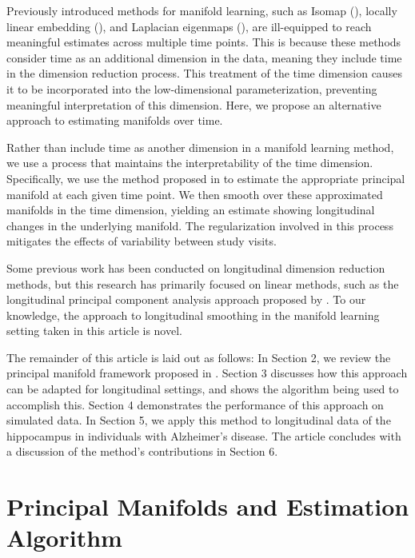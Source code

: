 \documentclass[11pt,reqno]{article}
\theoremstyle{definition}
\begin{document}
Previously introduced methods for manifold learning, such as Isomap (\cite{tenenbaumGlobalGeometricFramework2000}), locally linear embedding (\cite{roweisNonlinearDimensionalityReduction2000}), and Laplacian eigenmaps (\cite{belkinLaplacianEigenmapsDimensionality2003a}), are ill-equipped to reach meaningful estimates across multiple time points. This is because these methods consider time as an additional dimension in the data, meaning they include time in the dimension reduction process. This treatment of the time dimension causes it to be incorporated into the low-dimensional parameterization, preventing meaningful interpretation of this dimension. Here, we propose an alternative approach to estimating manifolds over time.

Rather than include time as another dimension in a manifold learning method, we use a process that maintains the interpretability of the time dimension. Specifically, we use the method proposed in \cite{mengPrincipalManifoldEstimation2021} to estimate the appropriate principal manifold at each given time point. We then smooth over these approximated manifolds in the time dimension, yielding an estimate showing longitudinal changes in the underlying manifold. The regularization involved in this process mitigates the effects of variability between study visits.

Some previous work has been conducted on longitudinal dimension reduction methods, but this research has primarily focused on linear methods, such as the longitudinal principal component analysis approach proposed by \cite{kinsonLongitudinalPrincipalComponent2020}. To our knowledge, the approach to longitudinal smoothing in the manifold learning setting taken in this article is novel.

The remainder of this article is laid out as follows: In Section 2, we review the principal manifold framework proposed in \cite{mengPrincipalManifoldEstimation2021}. Section 3 discusses how this approach can be adapted for longitudinal settings, and shows the algorithm being used to accomplish this. Section 4 demonstrates the performance of this approach on simulated data. In Section 5, we apply this method to longitudinal data of the hippocampus in individuals with Alzheimer's disease. The article concludes with a discussion of the method's contributions in Section 6.

\section{Principal Manifolds and Estimation Algorithm}
\end{document}
